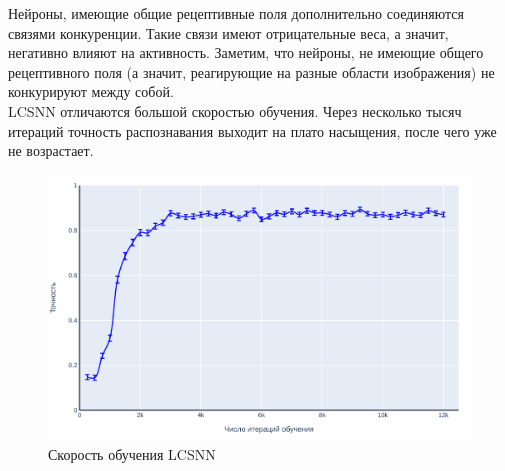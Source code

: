 \documentclass[a4paper]{article}
\begin{document}



Нейроны, имеющие общие рецептивные поля дополнительно соединяются связями конкуренции. Такие связи имеют отрицательные веса, а значит, негативно влияют на активность. Заметим, что нейроны, не имеющие общего рецептивного поля (а значит, реагирующие на разные области изображения) не конкурируют между собой.\\
LCSNN отличаются большой скоростью обучения. Через несколько тысяч итераций точность распознавания выходит на плато насыщения, после чего уже не возрастает.

\begin{center}
\begin{figure}[H]
 \includegraphics[width=\textwidth,keepaspectratio=true]{acc-n_iter_ru.pdf}
 \caption{Скорость обучения LCSNN}
\end{figure}
\end{center}
\end{document}
